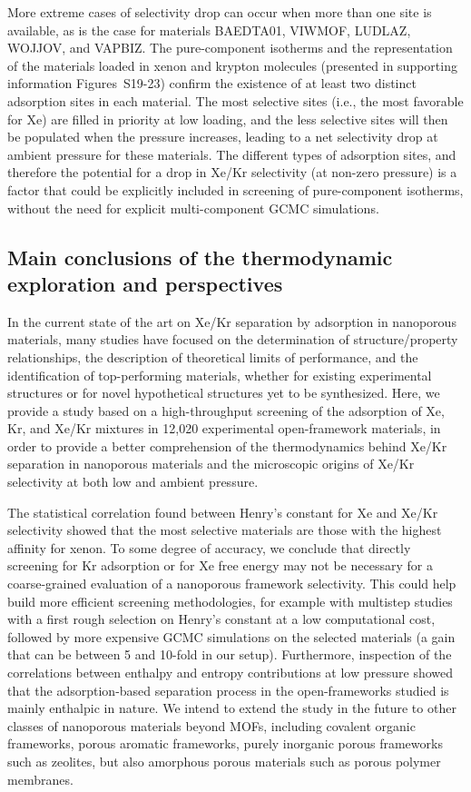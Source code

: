 \documentclass[main.tex]{subfiles}
\begin{document}
  More extreme cases of selectivity drop can occur when more than one site is available, as is the case for materials BAEDTA01, VIWMOF, LUDLAZ, WOJJOV, and VAPBIZ. The pure-component isotherms and the representation of the materials loaded in xenon and krypton molecules (presented in supporting information Figures~S19-23) confirm the existence of at least two distinct adsorption sites in each material. The most selective sites (i.e., the most favorable for Xe) are filled in priority at low loading, and the less selective sites will then be populated when the pressure increases, leading to a net selectivity drop at ambient pressure for these materials. The different types of adsorption sites, and therefore the potential for a drop in Xe/Kr selectivity (at non-zero pressure) is a factor that could be explicitly included in screening of pure-component isotherms, without the need for explicit multi-component GCMC simulations.

  \subsection{Main conclusions of the thermodynamic exploration and perspectives}

  In the current state of the art on Xe/Kr separation by adsorption in nanoporous materials, many studies have focused on the determination of structure/property relationships, the description of theoretical limits of performance, and the identification of top-performing materials, whether for existing experimental structures or for novel hypothetical structures yet to be synthesized. Here, we provide a study based on a high-throughput screening of the adsorption of Xe, Kr, and Xe/Kr mixtures in 12,020 experimental open-framework materials, in order to provide a better comprehension of the thermodynamics behind Xe/Kr separation in nanoporous materials and the microscopic origins of Xe/Kr selectivity at both low and ambient pressure. 

The statistical correlation found between Henry's constant for Xe and Xe/Kr selectivity showed that the most selective materials are those with the highest affinity for xenon. To some degree of accuracy, we conclude that directly screening for Kr adsorption or for Xe free energy may not be necessary for a coarse-grained evaluation of a nanoporous framework selectivity. This could help build more efficient screening methodologies, for example with multistep studies with a first rough selection on Henry's constant at a low computational cost, followed by more expensive GCMC simulations on the selected materials (a gain that can be between 5 and 10-fold in our setup). Furthermore, inspection of the correlations between enthalpy and entropy contributions at low pressure showed that the adsorption-based separation process in the open-frameworks studied is mainly enthalpic in nature. We intend to extend the study in the future to other classes of nanoporous materials beyond MOFs, including covalent organic frameworks, porous aromatic frameworks, purely inorganic porous frameworks such as zeolites, but also amorphous porous materials such as porous polymer membranes.
\end{document}
